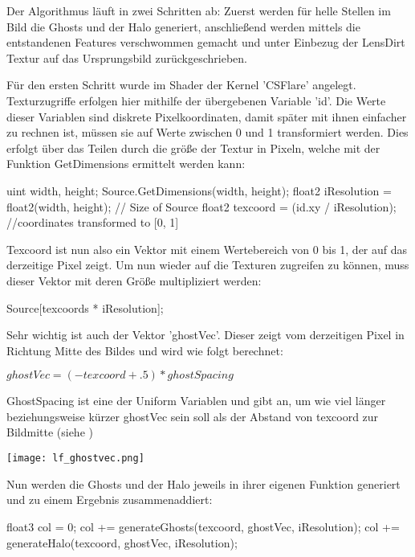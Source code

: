 Der Algorithmus läuft in zwei Schritten ab: Zuerst werden für helle Stellen im Bild die Ghosts und der Halo generiert, anschlie{\ss}end werden mittels  die entstandenen Features verschwommen gemacht und unter Einbezug der LensDirt Textur auf das Ursprungsbild zurückgeschrieben.

Für den ersten Schritt wurde im Shader der Kernel 'CSFlare' angelegt. Texturzugriffe erfolgen hier mithilfe der übergebenen Variable 'id'. Die Werte dieser Variablen sind diskrete Pixelkoordinaten, damit später mit ihnen einfacher zu rechnen ist, müssen sie auf Werte zwischen 0 und 1 transformiert werden. Dies erfolgt über das Teilen durch die grö{\ss}e der Textur in Pixeln, welche mit der Funktion GetDimensions ermittelt werden kann:

\begin{hlsl}
    uint width, height;
    Source.GetDimensions(width, height);
    float2 iResolution = float2(width, height); // Size of Source
    float2 texcoord = (id.xy / iResolution); //coordinates transformed to [0, 1]
\end{hlsl}

Texcoord ist nun also ein Vektor mit einem Wertebereich von 0 bis 1, der auf das derzeitige Pixel zeigt. Um nun wieder auf die Texturen zugreifen zu können, muss dieser Vektor mit deren Grö{\ss}e multipliziert werden:

\begin{hlsl}
Source[texcoords * iResolution];
\end{hlsl}

Sehr wichtig ist auch der Vektor 'ghostVec'. Dieser zeigt vom derzeitigen Pixel in Richtung Mitte des Bildes und wird wie folgt berechnet:

$ghostVec = ( -texcoord + .5 ) * ghostSpacing$

GhostSpacing ist eine der Uniform Variablen und gibt an, um wie viel länger beziehungsweise kürzer ghostVec sein soll als der Abstand von texcoord zur Bildmitte (siehe )

\captionsetup{type=figure}
\texttt{[image: lf\_ghostvec.png]}
\label{img:lfghostvec}

Nun werden die Ghosts und der Halo jeweils in ihrer eigenen Funktion generiert und zu einem Ergebnis zusammenaddiert:

\begin{hlsl}
float3 col = 0;
col += generateGhosts(texcoord, ghostVec, iResolution);
col += generateHalo(texcoord, ghostVec, iResolution);
\end{hlsl}

